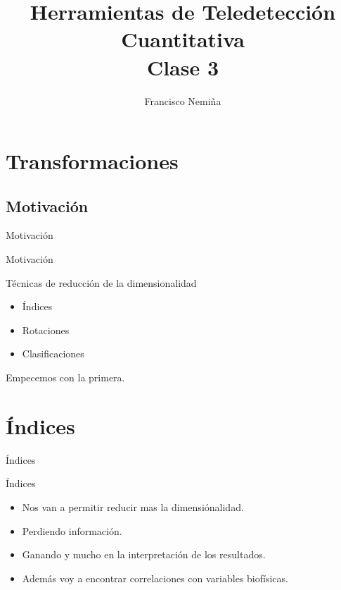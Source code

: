 \documentclass[handout]{beamer}
\title{Herramientas de Teledetección Cuantitativa\\{\small Clase 3}}
\author{Francisco Nemi\~na}
\institute{Unidad de Educaci\'on y Formaci\'on Masiva \\ Comisi\'on Nacional de
Actividades Espaciales}
\date{}
\begin{document}
\begin{frame}
    \maketitle
\end{frame}

\section{Transformaciones}
\subsection{Motivaci\'on}

\begin{frame}{Motivaci\'on}
  \begin{center}
    \end{center}
\end{frame}

\begin{frame}{Motivaci\'on}
  \begin{block}{T\'ecnicas de reducci\'on de la dimensionalidad}
    \begin{itemize}[<+>]
      \item \'Indices
      \item Rotaciones
      \item Clasificaciones
    \end{itemize}
    \pause
    Empecemos con la primera.
  \end{block}
\end{frame}

\section{\'Indices}

\begin{frame}{\'Indices}
  \begin{block}{\'Indices}
    \begin{itemize}[<+>]
      \item Nos van a permitir reducir mas la dimensi\'onalidad.
      \item Perdiendo informaci\'on.
      \item Ganando y mucho en la interpretaci\'on de los resultados.
      \item Adem\'as voy a encontrar correlaciones con variables biof\'isicas.
    \end{itemize}
  \end{block}
\end{frame}
\end{document}
